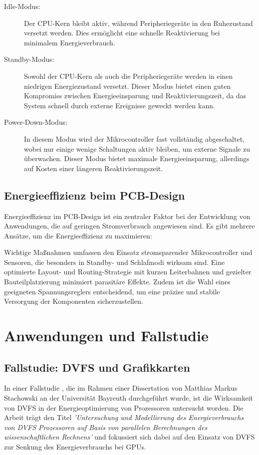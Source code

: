 \documentclass[footmark=none]{tubaf-thesis}
\begin{document}
			\begin{description}
				\item[Idle-Modus:] Der CPU-Kern bleibt aktiv, während Peripheriegeräte in den Ruhezustand versetzt werden. Dies ermöglicht eine schnelle Reaktivierung bei minimalem Energieverbrauch. \cite{dermikrocontroller}
				\item[Standby-Modus:] \sloppy Sowohl der CPU-Kern als auch die Peripheriegeräte werden in einen niedrigen Energiezustand versetzt. Dieser Modus bietet einen guten Kompromiss zwischen Energieeinsparung und Reaktivierungszeit, da das System schnell durch externe Ereignisse geweckt werden kann. \cite{dermikrocontroller}
				\item[Power-Down-Modus:] In diesem Modus wird der Mikrocontroller fast vollständig abgeschaltet, wobei nur einige wenige Schaltungen aktiv bleiben, um externe Signale zu überwachen. Dieser Modus bietet maximale Energieeinsparung, allerdings auf Kosten einer längeren Reaktivierungszeit. \cite{dermikrocontroller}
			\end{description}
			
		\section{Energieeffizienz beim PCB-Design}
			Energieeffizienz im PCB-Design ist ein zentraler Faktor bei der Entwicklung von Anwendungen, die auf geringen Stromverbrauch angewiesen sind. Es gibt mehrere Ansätze, um die Energieeffizienz zu maximieren:
		
			Wichtige Maßnahmen umfassen den Einsatz stromsparender Mikrocontroller und Sensoren, die besonders in Standby- und Schlafmodi wirksam sind. Eine optimierte Layout- und Routing-Strategie mit kurzen Leiterbahnen und gezielter Bauteilplatzierung minimiert parasitäre Effekte. Zudem ist die Wahl eines geeigneten Spannungsreglers entscheidend, um eine präzise und stabile Versorgung der Komponenten sicherzustellen.
		
	\chapter{Anwendungen und Fallstudie}
       	
        \section{Fallstudie: DVFS und Grafikkarten}
        	In einer Fallstudie \cite{stachowski2022untersuchung}, die im Rahmen einer Dissertation von Matthias Markus Stachowski an der Universität Bayreuth durchgeführt wurde, ist die Wirksamkeit von DVFS in der Energieoptimierung von Prozessoren untersucht worden. Die Arbeit trägt den Titel \textit{'Untersuchung und Modellierung des Energieverbrauchs von DVFS Prozessoren auf Basis von parallelen Berechnungen des wissenschaftlichen Rechnens'} und fokussiert sich dabei auf den Einsatz von DVFS zur Senkung des Energieverbrauchs bei GPUs.
        	
\end{document}
